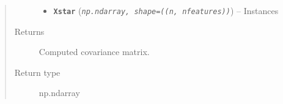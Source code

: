 \documentclass[letterpaper,10pt,english]{sphinxmanual}
\begin{document}
\begin{fulllineitems}
\begin{fulllineitems}
\begin{quote}
\begin{description}
\begin{itemize}
\item {} 
\textbf{\texttt{Xstar}} (\emph{\texttt{np.ndarray, shape=((n, nfeatures))}}) -- Instances

\end{itemize}

\item[{Returns}] \leavevmode
Computed covariance matrix.

\item[{Return type}] \leavevmode
np.ndarray

\end{description}\end{quote}

\end{fulllineitems}


\begin{fulllineitems}
\label{pyGPGO.covfunc:pyGPGO.covfunc.expSine.gradK}
\end{fulllineitems}


\end{fulllineitems}

\end{document}
